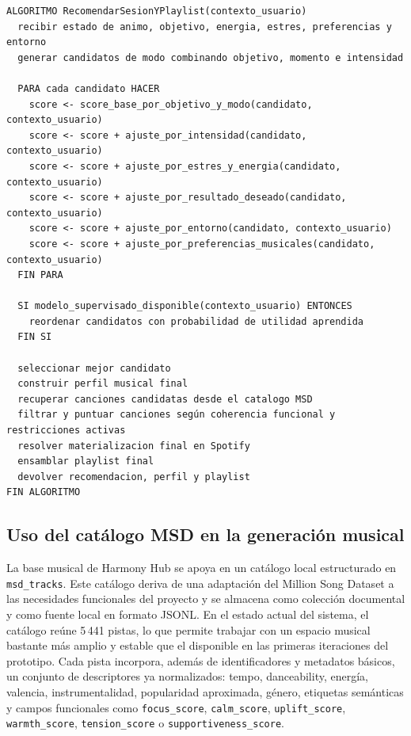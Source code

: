 \begin{listing}[H]
\begin{verbatim}
ALGORITMO RecomendarSesionYPlaylist(contexto_usuario)
  recibir estado de animo, objetivo, energia, estres, preferencias y entorno
  generar candidatos de modo combinando objetivo, momento e intensidad

  PARA cada candidato HACER
    score <- score_base_por_objetivo_y_modo(candidato, contexto_usuario)
    score <- score + ajuste_por_intensidad(candidato, contexto_usuario)
    score <- score + ajuste_por_estres_y_energia(candidato, contexto_usuario)
    score <- score + ajuste_por_resultado_deseado(candidato, contexto_usuario)
    score <- score + ajuste_por_entorno(candidato, contexto_usuario)
    score <- score + ajuste_por_preferencias_musicales(candidato, contexto_usuario)
  FIN PARA

  SI modelo_supervisado_disponible(contexto_usuario) ENTONCES
    reordenar candidatos con probabilidad de utilidad aprendida
  FIN SI

  seleccionar mejor candidato
  construir perfil musical final
  recuperar canciones candidatas desde el catalogo MSD
  filtrar y puntuar canciones según coherencia funcional y restricciones activas
  resolver materializacion final en Spotify
  ensamblar playlist final
  devolver recomendacion, perfil y playlist
FIN ALGORITMO
\end{verbatim}
\caption{Pseudocódigo del algoritmo híbrido de recomendación de sesión y playlist.}
\label{lst:pseudocodigo_recomendacion}
\end{listing}

\subsection{Uso del catálogo MSD en la generación musical}

La base musical de Harmony Hub se apoya en un catálogo local estructurado en
\texttt{msd\_tracks}. Este catálogo deriva de una adaptación del
Million Song Dataset \cite{msd_2011} a las necesidades funcionales del
proyecto y se almacena como colección documental y como fuente local en formato
JSONL. En el estado
actual del sistema, el catálogo reúne 5\,441 pistas, lo que permite trabajar
con un espacio musical bastante más amplio y estable que el disponible en las
primeras iteraciones del prototipo. Cada pista incorpora, además de
identificadores y metadatos básicos, un conjunto de descriptores ya
normalizados: tempo, danceability, energía, valencia,
instrumentalidad, popularidad aproximada, género, etiquetas semánticas y
campos funcionales como \texttt{focus\_score}, \texttt{calm\_score},
\texttt{uplift\_score}, \texttt{warmth\_score}, \texttt{tension\_score} o
\texttt{supportiveness\_score}.

